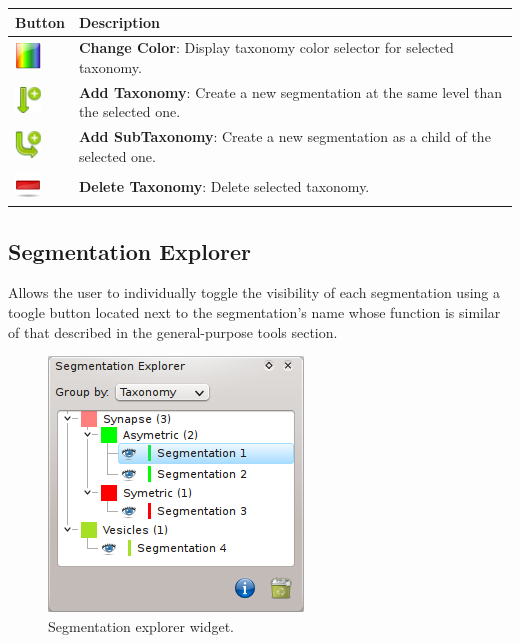 \begin{tabular}{| m{1.3cm} | m{13.5cm} |}
\hline
\textbf{Button} & \textbf{Description}\\
\hline
\includegraphics[width=0.7cm]{../../frontend/rsc/rainbow} &
\textbf{Change Color}: Display taxonomy color selector for selected taxonomy.\\
\hline
\includegraphics[width=0.7cm]{../../frontend/rsc/create_node} &
\textbf{Add Taxonomy}: Create a new segmentation at the same level than the
selected one.\\
\hline
\includegraphics[width=0.7cm]{../../frontend/rsc/create_subnode} &
\textbf{Add SubTaxonomy}: Create a new segmentation as a child of the selected
one.\\
\hline
\includegraphics[width=0.7cm]{../../frontend/rsc/remove} &
\textbf{Delete Taxonomy}: Delete selected taxonomy.\\
\hline
\end{tabular}
\vspace{0.3cm}

\subsection{Segmentation Explorer}
Allows the user to individually toggle the visibility of each segmentation using a toogle button
located next to the segmentation's name whose function is similar of that described in the
general-purpose tools section.
\begin{figure}[H]
\centering
\includegraphics{fig/SegmentationExplorer}
\caption{Segmentation explorer widget.}
\end{figure}

